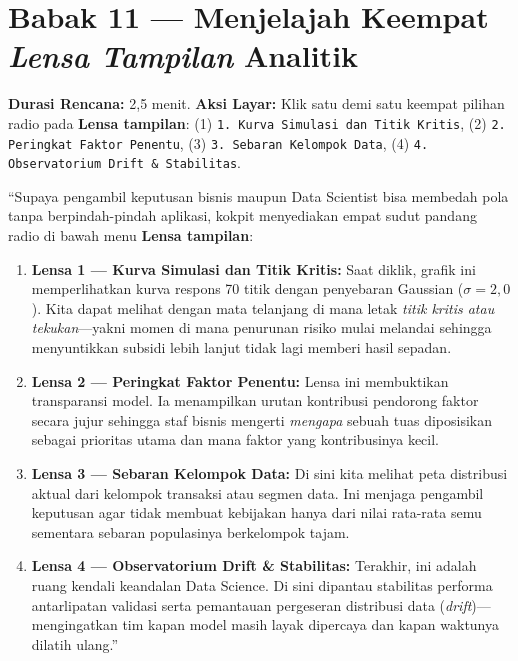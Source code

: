 \documentclass[11pt,a4paper,oneside]{book}
\newcommand{\code}[1]{{\small\nolinkurl{#1}}}
\begin{document}
\section{Babak 11 --- Menjelajah Keempat \emph{Lensa Tampilan} Analitik}

\begin{stagebox}
\textbf{Durasi Rencana:} 2,5 menit. \quad \textbf{Aksi Layar:} Klik satu demi satu keempat pilihan radio pada \textbf{Lensa tampilan}: (1) \code{1. Kurva Simulasi dan Titik Kritis}, (2) \code{2. Peringkat Faktor Penentu}, (3) \code{3. Sebaran Kelompok Data}, (4) \code{4. Observatorium Drift & Stabilitas}.
\end{stagebox}

\begin{scriptbox}
``Supaya pengambil keputusan bisnis maupun Data Scientist bisa membedah pola tanpa berpindah-pindah aplikasi, kokpit menyediakan empat sudut pandang radio di bawah menu \textbf{Lensa tampilan}:

\begin{enumerate}
  \item \textbf{Lensa 1 --- Kurva Simulasi dan Titik Kritis:} Saat diklik, grafik ini memperlihatkan kurva respons 70 titik dengan penyebaran Gaussian ($\sigma = 2{,}0$). Kita dapat melihat dengan mata telanjang di mana letak \emph{titik kritis atau tekukan}---yakni momen di mana penurunan risiko mulai melandai sehingga menyuntikkan subsidi lebih lanjut tidak lagi memberi hasil sepadan.
  \item \textbf{Lensa 2 --- Peringkat Faktor Penentu:} Lensa ini membuktikan transparansi model. Ia menampilkan urutan kontribusi pendorong faktor secara jujur sehingga staf bisnis mengerti \emph{mengapa} sebuah tuas diposisikan sebagai prioritas utama dan mana faktor yang kontribusinya kecil.
  \item \textbf{Lensa 3 --- Sebaran Kelompok Data:} Di sini kita melihat peta distribusi aktual dari kelompok transaksi atau segmen data. Ini menjaga pengambil keputusan agar tidak membuat kebijakan hanya dari nilai rata-rata semu sementara sebaran populasinya berkelompok tajam.
  \item \textbf{Lensa 4 --- Observatorium Drift \& Stabilitas:} Terakhir, ini adalah ruang kendali keandalan Data Science. Di sini dipantau stabilitas performa antarlipatan validasi serta pemantauan pergeseran distribusi data (\emph{drift})---mengingatkan tim kapan model masih layak dipercaya dan kapan waktunya dilatih ulang.''
\end{enumerate}
\end{scriptbox}
\end{document}
